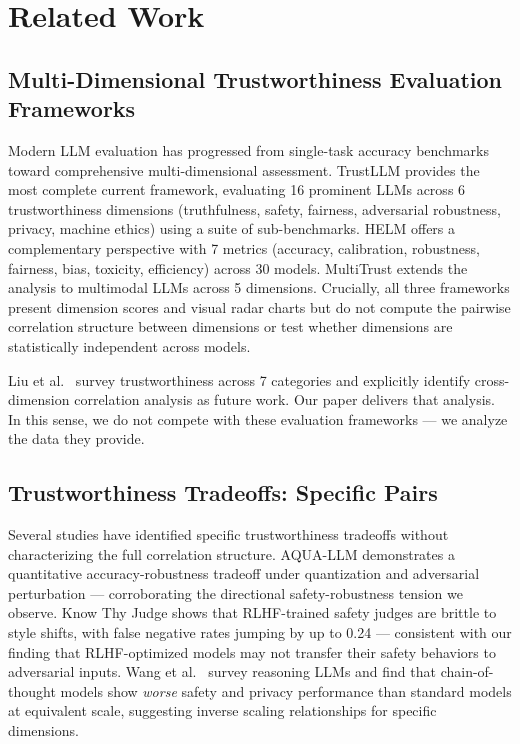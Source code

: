 \section{Related Work}
\label{sec:related}

\subsection{Multi-Dimensional Trustworthiness Evaluation Frameworks}

Modern LLM evaluation has progressed from single-task accuracy benchmarks toward comprehensive multi-dimensional assessment. TrustLLM \cite{sun2024trustllm} provides the most complete current framework, evaluating 16 prominent LLMs across 6 trustworthiness dimensions (truthfulness, safety, fairness, adversarial robustness, privacy, machine ethics) using a suite of sub-benchmarks. HELM \cite{liang2023helm} offers a complementary perspective with 7 metrics (accuracy, calibration, robustness, fairness, bias, toxicity, efficiency) across 30 models. MultiTrust \cite{zhang2024multitrust} extends the analysis to multimodal LLMs across 5 dimensions. Crucially, all three frameworks present dimension scores and visual radar charts but do not compute the pairwise correlation structure between dimensions or test whether dimensions are statistically independent across models.

Liu et al.\ \cite{liu2023trustworthy} survey trustworthiness across 7 categories and explicitly identify cross-dimension correlation analysis as future work. Our paper delivers that analysis. In this sense, we do not compete with these evaluation frameworks --- we analyze the data they provide.

\subsection{Trustworthiness Tradeoffs: Specific Pairs}

Several studies have identified specific trustworthiness tradeoffs without characterizing the full correlation structure. AQUA-LLM \cite{gungor2025aquallm} demonstrates a quantitative accuracy-robustness tradeoff under quantization and adversarial perturbation --- corroborating the directional safety-robustness tension we observe. Know Thy Judge \cite{eiras2025know} shows that RLHF-trained safety judges are brittle to style shifts, with false negative rates jumping by up to 0.24 --- consistent with our finding that RLHF-optimized models may not transfer their safety behaviors to adversarial inputs. Wang et al.\ \cite{wang2025survey} survey reasoning LLMs and find that chain-of-thought models show \emph{worse} safety and privacy performance than standard models at equivalent scale, suggesting inverse scaling relationships for specific dimensions.

